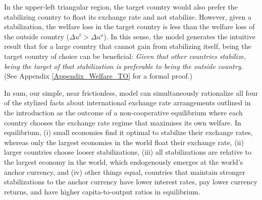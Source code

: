 \documentclass[12pt,letter]{article}
\theoremstyle{break} \theorembodyfont{\normalfont\itshape}
\theoremstyle{break}
\theoremstyle{break} \theorembodyfont{\normalfont\itshape}
\theoremstyle{break} \theorembodyfont{\normalfont\itshape}
\begin{document}
In the upper-left triangular region, the target country would also
prefer the stabilizing country to float its exchange rate and not
stabilize. However, given a stabilization, the welfare loss in the
target country is less than the welfare loss of the outside country
(\(\Delta u^t>\Delta u^o\)). In this sense, the model generates the
intuitive result that for a large country that cannot gain from
stabilizing itself, being the target country of choice can be
beneficial: \textit{Given that other countries stabilize, being the
  target of that stabilization is preferable to being the outside
  country.} {(See Appendix \ref{Appendix_Welfare_TO} for a formal
  proof.) } \bigskip

In sum, our simple, near frictionless, model can simultaneously
rationalize all four of the stylized facts about international
exchange rate arrangements outlined in the introduction as the outcome
of a non-cooperative equilibrium where each country chooses the
exchange rate regime that maximises its own welfare. In equilibrium,
(i) small economies find it optimal to stabilize their exchange rates,
whereas only the largest economies in the world float their exchange
rate, (ii) larger countries choose looser stabilizations, (iii) all
stabilizations are relative to the largest economy in the world, which
endogenously emerges at the world's anchor currency, and (iv) other
things equal, countries that maintain stronger stabilizations to the
anchor currency have lower interest rates, pay lower currency returns,
and have higher capita-to-output ratios in equilibrium.
\end{document}
